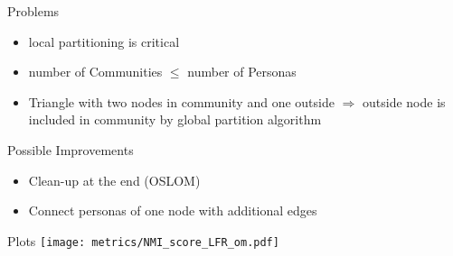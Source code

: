 \documentclass[11pt]{beamer}
\begin{document}
\begin{frame}{Problems}
	\begin{itemize}
		\item local partitioning is critical
		\item number of Communities $\leq$ number of Personas
		\item Triangle with two nodes in community and one outside $\Rightarrow$ outside node is included in community by global partition algorithm 
	\end{itemize}
\end{frame}

\begin{frame}{Possible Improvements}
	\begin{itemize}
		\item Clean-up at the end (OSLOM)
		\item Connect personas of one node with additional edges
	\end{itemize}
\end{frame}

\begin{frame}{Plots}
	\centering
	\texttt{[image: metrics/NMI\_score\_LFR\_om.pdf]}
\end{frame}
\end{document}
